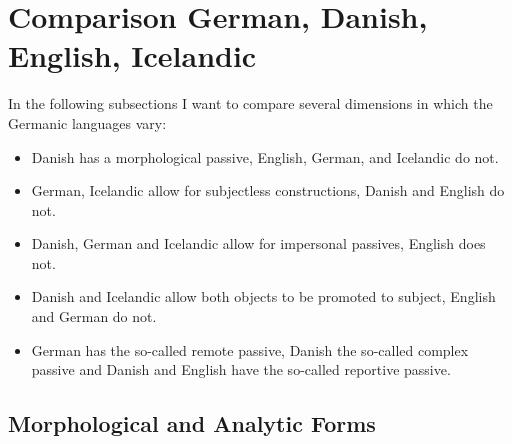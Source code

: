






\section{Comparison German, Danish, English, Icelandic}

In the following subsections I want to compare several dimensions in which the Germanic languages
vary:
\begin{itemize}
\item Danish has a morphological passive, English, German, and Icelandic do not.

\item German, Icelandic allow for subjectless constructions, Danish and English do not.

\item Danish, German and Icelandic allow for impersonal passives, English does not.

\item Danish and Icelandic allow both objects to be promoted to subject, English and German do not.

\item German has the so-called remote passive, Danish the so-called complex passive and Danish and English
  have the so-called reportive passive.
\end{itemize}



\subsection{Morphological and Analytic Forms}

